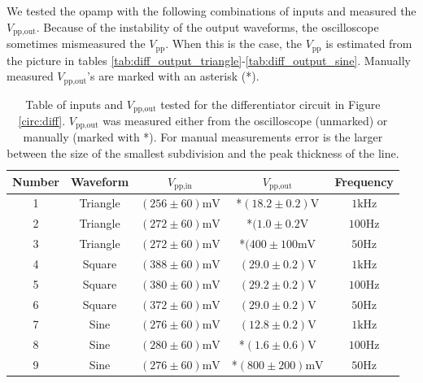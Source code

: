 \documentclass[11pt]{article}
\begin{document}
We tested the opamp with the following combinations of inputs and measured the
$V_\text{pp,out}$. Because of the instability of the output waveforms, the
oscilloscope sometimes mismeasured the $V_\text{pp}$. When this is the case, the 
$V_\text{pp}$ is estimated from the picture in tables 
\ref{tab:diff_output_triangle}-\ref{tab:diff_output_sine}. Manually measured
$V_\text{pp,out}$'s are marked with an asterisk (*). 
\begin{table}[H]
	\centering
	\begin{tabular}{|c|c|c|c|c|}
		\hline
		Number 	& Waveform 		& $V_{\text{pp,in}}$ 							& $V_{\text{pp,out}}$ 				& Frequency  \\
		\hline                                                                                                                  
		1		& Triangle 		& $(256 \pm 60) \si{\milli\volt}$				& *$(18.2 \pm 0.2) \si{\volt} $		& $1 \si{\kilo\hertz}$ \\
		\hline
		2		& Triangle 		& $(272 \pm 60) \si{\milli\volt}$				& *$(1.0 \pm 0.2 \si{\volt}$		& $100 \si{\hertz}$ \\
		\hline
		3		& Triangle 		& $(272 \pm 60) \si{\milli\volt}$				& *$(400 \pm 100 \si{\milli\volt}$	& $50 \si{\hertz}$ \\
		\hline
		4		& Square		& $(388 \pm 60) \si{\milli\volt}$				& $(29.0 \pm 0.2) \si{\volt}$		& $1 \si{\kilo\hertz}$ \\
		\hline
		5		& Square 		& $(380 \pm 60) \si{\milli\volt}$				& $(29.2 \pm 0.2) \si{\volt}$		& $100 \si{\hertz}$ \\
		\hline
		6		& Square		& $(372 \pm 60) \si{\milli\volt}$ 				& $(29.0 \pm 0.2)\si{\volt}$		& $50 \si{\hertz}$ \\
		\hline
		7		& Sine			& $(276 \pm 60) \si{\milli\volt}$				& $(12.8 \pm 0.2) \si{\volt}$		& $1 \si{\kilo\hertz}$ \\
		\hline
		8		& Sine			& $(280 \pm 60) \si{\milli\volt}$				& *$(1.6 \pm 0.6) \si{\volt}$		& $100 \si{\hertz}$ \\
		\hline
		9		& Sine			& $(276 \pm 60) \si{\milli\volt}$				& *$(800 \pm 200) \si{\milli\volt}$	& $50 \si{\hertz}$ \\
		\hline
	\end{tabular}
	\caption{
		Table of inputs and $V_\text{pp,out}$ tested for the differentiator 
		circuit in Figure \ref{circ:diff}. $V_\text{pp,out}$ was measured
		either from the oscilloscope (unmarked) or manually (marked with *).
		For manual measurements error is the larger between the size of the 
		smallest subdivision and the peak thickness of the line.
	}
	\label{tab:diff_inputs}	
\end{table}
\end{document}
